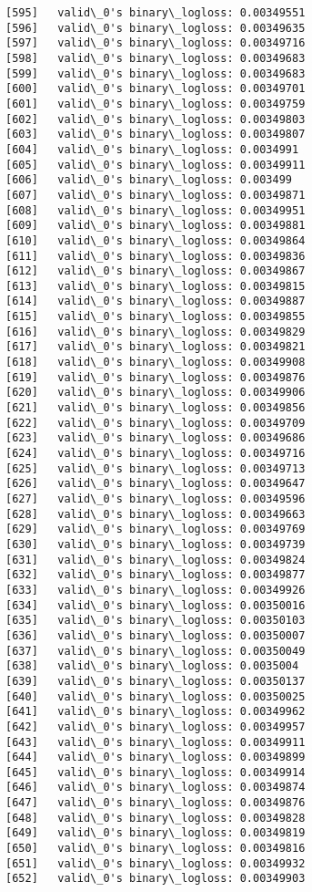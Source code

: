 \documentclass[11pt]{article}
\begin{document}
\begin{Verbatim}[commandchars=\\\{\}]
[595]	valid\_0's binary\_logloss: 0.00349551
[596]	valid\_0's binary\_logloss: 0.00349635
[597]	valid\_0's binary\_logloss: 0.00349716
[598]	valid\_0's binary\_logloss: 0.00349683
[599]	valid\_0's binary\_logloss: 0.00349683
[600]	valid\_0's binary\_logloss: 0.00349701
[601]	valid\_0's binary\_logloss: 0.00349759
[602]	valid\_0's binary\_logloss: 0.00349803
[603]	valid\_0's binary\_logloss: 0.00349807
[604]	valid\_0's binary\_logloss: 0.0034991
[605]	valid\_0's binary\_logloss: 0.00349911
[606]	valid\_0's binary\_logloss: 0.003499
[607]	valid\_0's binary\_logloss: 0.00349871
[608]	valid\_0's binary\_logloss: 0.00349951
[609]	valid\_0's binary\_logloss: 0.00349881
[610]	valid\_0's binary\_logloss: 0.00349864
[611]	valid\_0's binary\_logloss: 0.00349836
[612]	valid\_0's binary\_logloss: 0.00349867
[613]	valid\_0's binary\_logloss: 0.00349815
[614]	valid\_0's binary\_logloss: 0.00349887
[615]	valid\_0's binary\_logloss: 0.00349855
[616]	valid\_0's binary\_logloss: 0.00349829
[617]	valid\_0's binary\_logloss: 0.00349821
[618]	valid\_0's binary\_logloss: 0.00349908
[619]	valid\_0's binary\_logloss: 0.00349876
[620]	valid\_0's binary\_logloss: 0.00349906
[621]	valid\_0's binary\_logloss: 0.00349856
[622]	valid\_0's binary\_logloss: 0.00349709
[623]	valid\_0's binary\_logloss: 0.00349686
[624]	valid\_0's binary\_logloss: 0.00349716
[625]	valid\_0's binary\_logloss: 0.00349713
[626]	valid\_0's binary\_logloss: 0.00349647
[627]	valid\_0's binary\_logloss: 0.00349596
[628]	valid\_0's binary\_logloss: 0.00349663
[629]	valid\_0's binary\_logloss: 0.00349769
[630]	valid\_0's binary\_logloss: 0.00349739
[631]	valid\_0's binary\_logloss: 0.00349824
[632]	valid\_0's binary\_logloss: 0.00349877
[633]	valid\_0's binary\_logloss: 0.00349926
[634]	valid\_0's binary\_logloss: 0.00350016
[635]	valid\_0's binary\_logloss: 0.00350103
[636]	valid\_0's binary\_logloss: 0.00350007
[637]	valid\_0's binary\_logloss: 0.00350049
[638]	valid\_0's binary\_logloss: 0.0035004
[639]	valid\_0's binary\_logloss: 0.00350137
[640]	valid\_0's binary\_logloss: 0.00350025
[641]	valid\_0's binary\_logloss: 0.00349962
[642]	valid\_0's binary\_logloss: 0.00349957
[643]	valid\_0's binary\_logloss: 0.00349911
[644]	valid\_0's binary\_logloss: 0.00349899
[645]	valid\_0's binary\_logloss: 0.00349914
[646]	valid\_0's binary\_logloss: 0.00349874
[647]	valid\_0's binary\_logloss: 0.00349876
[648]	valid\_0's binary\_logloss: 0.00349828
[649]	valid\_0's binary\_logloss: 0.00349819
[650]	valid\_0's binary\_logloss: 0.00349816
[651]	valid\_0's binary\_logloss: 0.00349932
[652]	valid\_0's binary\_logloss: 0.00349903

\end{Verbatim}
\end{document}
